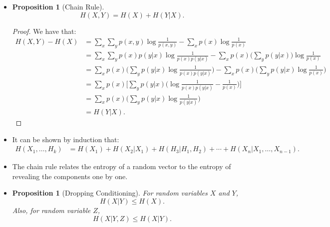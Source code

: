 \documentclass[10pt]{article}
\newtheorem{proposition}[lemma]{Proposition}
\begin{document}
\begin{itemize}
  	\item \begin{proposition}[Chain Rule]
  		$$H(X,Y) = H(X) + H(Y|X).$$
  	\end{proposition}
  	\begin{proof}
  		We have that:
  		\begin{align*}
  			H(X,Y) - H(X)
  			&= \sum_{x} \sum_{y} p(x,y) \log \frac{1}{p(x,y)} 
  			   - \sum_{x} p(x) \log \frac{1}{p(x)} \\
  			&= \sum_{x} \sum_{y} p(x)  p(y|x) \log \frac{1}{p(x)p(y|x)}
  			   - \sum_{x} p(x) \bigg( \sum_{y} p(y|x) \bigg) \log \frac{1}{p(x)} \\
  			&= \sum_{x} p(x) \bigg( \sum_{y}  p(y|x) \log \frac{1}{p(x)p(y|x)} \bigg)
  			   - \sum_{x} p(x) \bigg( \sum_{y} p(y|x) \log \frac{1}{p(x)} \bigg) \\
  			&= \sum_{x} p(x) \bigg[ \sum_{y}  p(y|x) \bigg( \log \frac{1}{p(x)p(y|x)} - \frac{1}{p(x)}  \bigg) \bigg] \\
  			&= \sum_{x} p(x) \bigg( \sum_{y}  p(y|x) \log \frac{1}{p(y|x)}  \bigg) \\
  			&= H(Y|X).
  		\end{align*}
  	\end{proof}

  	\item It can be shown by induction that:
  	\begin{align*}
  		H(X_1, \dotsc, H_k)
  		&= H(X_1) + H(X_2|X_1) + H(H_3|H_1,H_2) + \dotsb + H(X_n|X_1, \dotsc, X_{n-1}).
  	\end{align*}

  	\item The chain rule relates the entropy of a random vector to the entropy of revealing the components one by one.

  	\item \begin{proposition}[Dropping Conditioning]
  		For random variables $X$ and $Y$,
  		$$H(X|Y) \leq H(X).$$
  		Also, for random variable $Z$, 
  		$$H(X|Y,Z) \leq H(X|Y).$$
  	\end{proposition}


\end{itemize}
\end{document}
